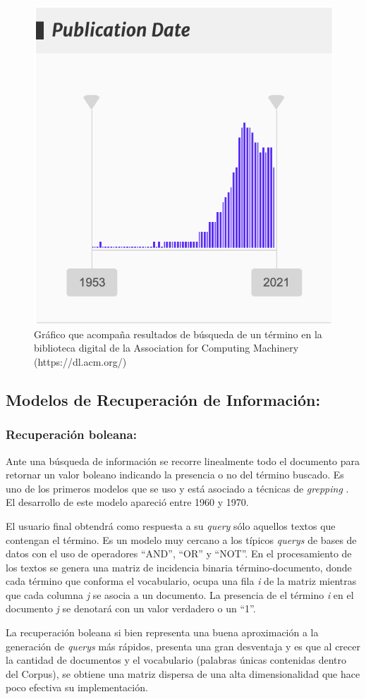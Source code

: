 \documentclass[
  12pt,
  openany]{book}
\begin{document}
\begin{figure}

{\centering \includegraphics[width=0.3\linewidth]{images/03-marco-teorico/busquedaacm} 

}

\caption{Gráfico que acompaña resultados de búsqueda de un término en la biblioteca digital de la Association for Computing Machinery (https://dl.acm.org/)}\label{fig:busquedasacm}
\end{figure}

\hypertarget{MRI}{%
\subsection{Modelos de Recuperación de Información:}\label{MRI}}

\hypertarget{MRIbol}{%
\subsubsection{Recuperación boleana:}\label{MRIbol}}

Ante una búsqueda de información se recorre linealmente todo el documento para retornar un valor boleano indicando la presencia o no del término buscado. Es uno de los primeros modelos que se uso y está asociado a técnicas de \emph{grepping} \citep{manning2008}. El desarrollo de este modelo apareció entre 1960 y 1970.

El usuario final obtendrá como respuesta a su \emph{query} sólo aquellos textos que contengan el término. Es un modelo muy cercano a los típicos \emph{querys} de bases de datos con el uso de operadores ``AND'', ``OR'' y ``NOT''. En el procesamiento de los textos se genera una matriz de incidencia binaria término-documento, donde cada término que conforma el vocabulario, ocupa una fila \emph{i} de la matriz mientras que cada columna \emph{j} se asocia a un documento. La presencia de el término \emph{i} en el documento \emph{j} se denotará con un valor verdadero o un ``1''.

La recuperación boleana si bien representa una buena aproximación a la generación de \emph{querys} más rápidos, presenta una gran desventaja y es que al crecer la cantidad de documentos y el vocabulario (palabras únicas contenidas dentro del Corpus), se obtiene una matriz dispersa de una alta dimensionalidad que hace poco efectiva su implementación.
\end{document}
